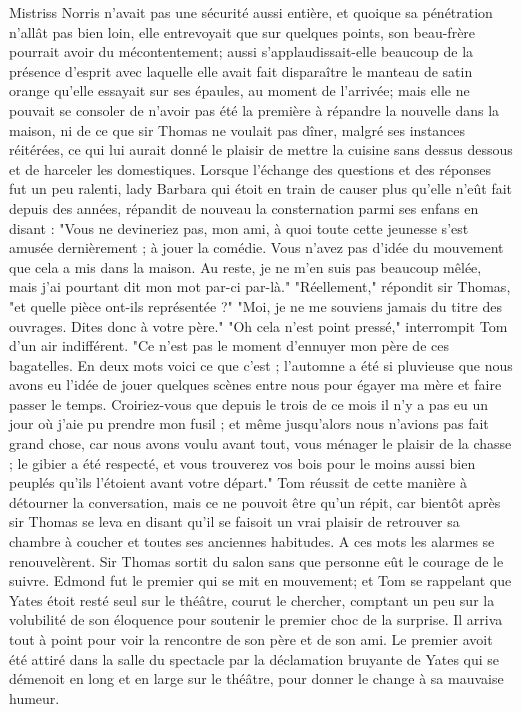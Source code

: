 Mistriss Norris n'avait pas une sécurité aussi entière, et quoique sa pénétration n'allât pas bien loin, elle entrevoyait que sur quelques points, son beau-frère pourrait avoir du mécontentement; aussi s'applaudissait-elle beaucoup de la présence d'esprit avec laquelle elle avait fait disparaître le manteau de satin orange qu'elle essayait sur ses épaules, au moment de l'arrivée; mais elle ne pouvait se consoler de n'avoir pas été la première à répandre la nouvelle dans la maison, ni de ce que sir Thomas ne voulait pas dîner, malgré ses instances réitérées, ce qui lui aurait donné le plaisir de mettre la cuisine sans dessus dessous et de harceler les domestiques.
Lorsque l'échange des questions et des réponses\setcounter{page}{134} fut un peu ralenti, lady Barbara qui étoit en train de causer plus qu'elle n'eût fait depuis des années, répandit de nouveau la consternation parmi ses enfans en disant : "Vous ne devineriez pas, mon ami, à quoi toute cette jeunesse s'est amusée dernièrement ; à jouer la comédie. Vous n'avez pas d'idée du mouvement que cela a mis dans la maison. Au reste, je ne m'en suis pas beaucoup mêlée, mais j'ai pourtant dit mon mot par-ci par-là." "Réellement," répondit sir Thomas, "et quelle pièce ont-ils représentée ?" "Moi, je ne me souviens jamais du titre des ouvrages. Dites donc à votre père." "Oh cela n'est point pressé," interrompit Tom d'un air indifférent. "Ce n'est pas le moment d'ennuyer mon père de ces bagatelles. En deux mots voici ce que c'est ; l'automne a été si pluvieuse que nous avons eu l'idée de jouer quelques scènes entre nous pour égayer ma mère et faire passer le temps. Croiriez-vous que depuis le trois de ce mois il n'y a pas eu un jour où j'aie pu prendre mon fusil ; et même jusqu'alors nous n'avions pas fait grand chose, car nous avons voulu avant tout, vous ménager le plaisir de la chasse ; le gibier a été respecté,\setcounter{page}{135} et vous trouverez vos bois pour le moins aussi bien peuplés qu'ils l'étoient avant votre départ."
Tom réussit de cette manière à détourner la conversation, mais ce ne pouvoit être qu'un répit, car bientôt après sir Thomas se leva en disant qu'il se faisoit un vrai plaisir de retrouver sa chambre à coucher et toutes ses anciennes habitudes. A ces mots les alarmes se renouvelèrent. Sir Thomas sortit du salon sans que personne eût le courage de le suivre. Edmond fut le premier qui se mit en mouvement; et Tom se rappelant que Yates étoit resté seul sur le théâtre, courut le chercher, comptant un peu sur la volubilité de son éloquence pour soutenir le premier choc de la surprise. Il arriva tout à point pour voir la rencontre de son père et de son ami. Le premier avoit été attiré dans la salle du spectacle par la déclamation bruyante de Yates qui se démenoit en long et en large sur le théâtre, pour donner le change à sa mauvaise humeur.
